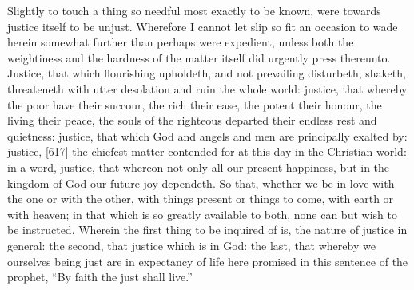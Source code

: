 Slightly to touch a thing so needful most exactly to be known, were towards justice itself to be unjust. Wherefore I cannot let slip so fit an occasion to wade herein somewhat further than perhaps were expedient, unless both the weightiness and the hardness of the matter itself did urgently press thereunto. Justice, that which flourishing upholdeth, and not prevailing disturbeth, shaketh, threateneth with utter desolation and ruin the whole world: justice, that whereby the poor have their succour, the rich their ease, the potent their honour, the living their peace, the souls of the righteous departed their endless rest and quietness: justice, that which God and angels and men are principally exalted by: justice, [617] the chiefest matter contended for at this day in the Christian world: in a word, justice, that whereon not only all our present happiness, but in the kingdom of God our future joy dependeth. So that, whether we be in love with the one or with the other, with things present or things to come, with earth or with heaven; in that which is so greatly available to both, none can but wish to be instructed. Wherein the first thing to be inquired of is, the nature of justice in general: the second, that justice which is in God: the last, that whereby we ourselves being just are in expectancy of life here promised in this sentence of the prophet, “By faith the just shall live.”

